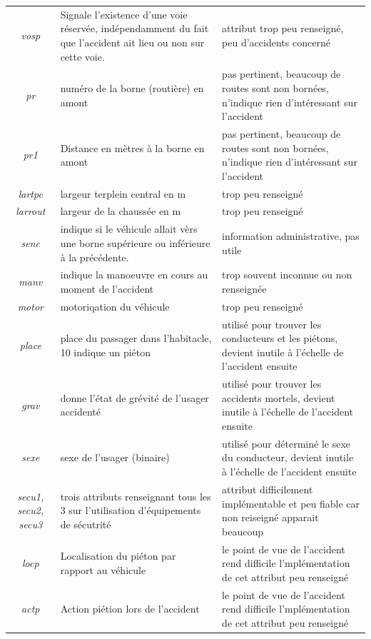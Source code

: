 \documentclass{article}
\begin{document}
\begin{center}
\begin{tabular}{ |c|p{4.5cm}|p{4.5cm} }
            \textit{vosp} & Signale l’existence d’une voie réservée, indépendamment du fait que l’accident ait lieu ou non sur cette voie. & attribut trop peu renseigné, peu d'accidents concerné\\
            \textit{pr} & numéro de la borne (routière) en amont  & pas pertinent, beaucoup de routes sont non bornées, n'indique rien d'intéressant sur l'accident\\
            \textit{pr1} & Distance en mètres à la borne en amont &  pas pertinent, beaucoup de routes sont non bornées, n'indique rien d'intéressant sur l'accident\\
            \textit{lartpc} & largeur terplein central en m & trop peu renseigné\\
            \textit{larrout} & largeur de la chaussée en m & trop peu renseigné\\
            \textit{senc} & indique si le véhicule allait vèrs une borne supérieure ou inférieure à la précédente. & information administrative, pas utile\\
            \textit{manv} & indique la manoeuvre en cours au moment de l'accident & trop souvent inconnue ou non renseignée\\
            \textit{motor} & motoriqation du véhicule & trop peu renseigné\\
            \textit{place} & place du passager dans l'habitacle, 10 indique un piéton & utilisé pour trouver les conducteurs et les piétons, devient inutile à l'échelle de l'accident ensuite\\
            \textit{grav} & donne l'état de grévité de l'usager accidenté & utilisé pour trouver les accidents mortels, devient inutile à l'échelle de l'accident ensuite\\
            \textit{sexe} & sexe de l'usager (binaire) & utilisé pour déterminé le sexe du conducteur, devient inutile à l'échelle de l'accident ensuite\\
            \textit{secu1, secu2, secu3} & trois attributs renseignant tous les 3 sur l'utilisation d'équipements de sécutrité & attribut difficilement implémentable et peu fiable car non reiseigné apparait beaucoup\\
            \textit{locp} & Localisation du piéton par rapport au véhicule & le point de vue de l'accident rend difficile l'mplémentation de cet attribut peu renseigné\\
            \textit{actp} & Action piétion lors de l'accident & le point de vue de l'accident rend difficile l'mplémentation de cet attribut peu renseigné\\

\end{tabular}
\end{center}
\end{document}
